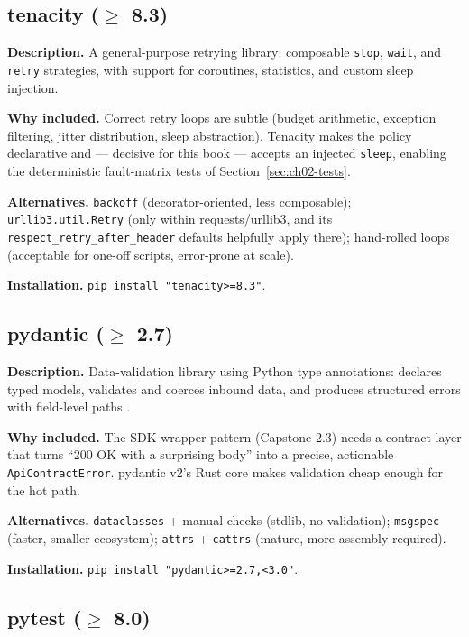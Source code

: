 \subsection{tenacity ($\geq$ 8.3)}

\textbf{Description.} A general-purpose retrying library: composable
\texttt{stop}, \texttt{wait}, and \texttt{retry} strategies, with support for
coroutines, statistics, and custom sleep injection.

\textbf{Why included.} Correct retry loops are subtle (budget arithmetic,
exception filtering, jitter distribution, sleep abstraction). Tenacity makes
the policy declarative and --- decisive for this book --- accepts an
injected \texttt{sleep}, enabling the deterministic fault-matrix tests of
Section~\ref{sec:ch02-tests}.

\textbf{Alternatives.} \texttt{backoff} (decorator-oriented, less
composable); \texttt{urllib3.util.Retry} (only within requests/urllib3, and
its \texttt{respect\_retry\_after\_header} defaults helpfully apply there);
hand-rolled loops (acceptable for one-off scripts, error-prone at scale).

\textbf{Installation.} \texttt{pip install "tenacity>=8.3"}.

\subsection{pydantic ($\geq$ 2.7)}

\textbf{Description.} Data-validation library using Python type annotations:
declares typed models, validates and coerces inbound data, and produces
structured errors with field-level paths \cite{pydanticdocs}.

\textbf{Why included.} The SDK-wrapper pattern (Capstone 2.3) needs a
contract layer that turns ``200 OK with a surprising body'' into a precise,
actionable \texttt{ApiContractError}. pydantic v2's Rust core makes
validation cheap enough for the hot path.

\textbf{Alternatives.} \texttt{dataclasses} + manual checks (stdlib, no
validation); \texttt{msgspec} (faster, smaller ecosystem); \texttt{attrs} +
\texttt{cattrs} (mature, more assembly required).

\textbf{Installation.} \texttt{pip install "pydantic>=2.7,<3.0"}.

\subsection{pytest ($\geq$ 8.0)}

